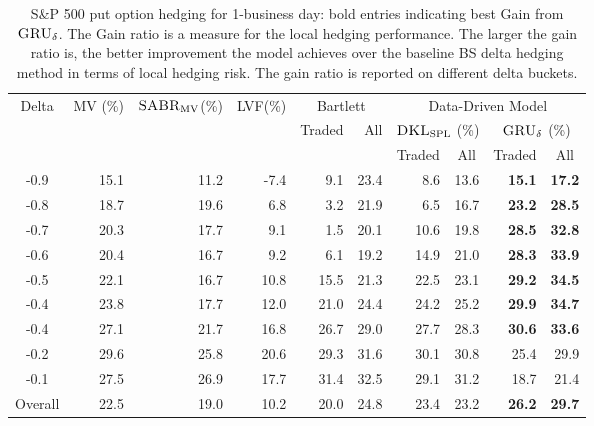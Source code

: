 \documentclass[letterpaper,12pt,titlepage,oneside,final]{book}
\numberwithin{equation}{section}
\theoremstyle{definition}
\newcommand{\model}{\textsc{GRU}_\delta}
\newcommand{\DKLs}{\bf\textsc{DKL}_{\text{SPL}}}
\newcommand{\LVF}{\textsc{LVF}}
\newcommand{\SABR}{\bf\textsc{SABR}_{\text{MV}}}
\begin{document}
\begin{table}[htp!]
\centering
\begin{threeparttable}
\begin{tabular}{|c |r r r r r r r r r|}
\hline
\multirow{3}{*}{Delta}&\multirow{3}{*}{MV (\%)}&\multirow{3}{*}{\;$\SABR$(\%)}&\multirow{3}{*}{\LVF (\%)}&\multicolumn{2}{c|}{Bartlett}& \multicolumn{4}{c|}{Data-Driven Model}\\
&&&&\multirow{2}{*}{Traded}&\multirow{2}{*}{All}&\multicolumn{2}{|c}{$\DKLs$ (\%)} &\multicolumn{2}{c|}{$\model$ (\%)}\\
&&&&&&\multicolumn{1}{|c}{\small Traded}&\multicolumn{1}{c}{\small All}&\multicolumn{1}{c}{\small Traded}&\multicolumn{1}{c|}{\small All}\\ \hline
  			-0.9 & 15.1    &11.2  &-7.4 &9.1  &23.4   &8.6    &13.6  &\textbf{15.1}    &\textbf{17.2} \\
			-0.8 & 18.7    &19.6  &6.8  &3.2  &21.9   &6.5    &16.7  &\textbf{23.2}    &\textbf{28.5} \\
			-0.7 & 20.3    &17.7  &9.1  &1.5  &20.1   &10.6   &19.8  &\textbf{28.5}    &\textbf{32.8} \\
			-0.6 & 20.4    &16.7  &9.2  &6.1  &19.2   &14.9   &21.0  &\textbf{28.3}    &\textbf{33.9} \\
			-0.5 & 22.1    &16.7  &10.8 &15.5 &21.3   &22.5   &23.1  &\textbf{29.2}    &\textbf{34.5} \\
			-0.4 & 23.8    &17.7  &12.0 &21.0 &24.4   &24.2   &25.2  &\textbf{29.9}    &\textbf{34.7} \\
			-0.4 & 27.1    &21.7  &16.8 &26.7 &29.0   &27.7   &28.3  &\textbf{30.6}    &\textbf{33.6} \\
			-0.2 & 29.6    &25.8  &20.6 &29.3 &31.6   &30.1   &30.8  &25.4    &29.9 \\
			-0.1 & 27.5    &26.9  &17.7 &31.4 &32.5   &29.1   &31.2  &18.7    &21.4 \\
			Overall &22.5  &19.0  &10.2 &20.0 &24.8   &23.4   &23.2  &\textbf{26.2}    &\textbf{29.7} \\
  \hline
\end{tabular}
\caption{S\&P 500 put option hedging for 1-business day: bold entries indicating best Gain from $\model$. The Gain ratio is a measure for the local hedging performance. The larger the gain ratio is, the better improvement the model achieves over the baseline BS delta hedging method in terms of local hedging risk. The gain ratio is reported on different delta buckets.  }
\label{SP500Put}

\end{threeparttable}
\end{table}
\end{document}

